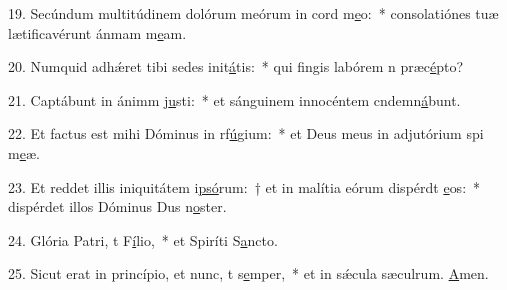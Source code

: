 19. Secúndum multitúdinem dolórum meórum in cord m\uline{e}o:~* consolatiónes tuæ lætificavérunt ánmam m\uline{e}am.\par 
20. Numquid adhǽret tibi sedes init\uline{á}tis:~* qui fingis labórem n præc\uline{é}pto?\par 
21. Captábunt in ánimm j\uline{u}sti:~* et sánguinem innocéntem cndemn\uline{á}bunt.\par 
22. Et factus est mihi Dóminus in rf\uline{ú}gium:~* et Deus meus in adjutórium spi m\uline{e}æ.\par 
23. Et reddet illis iniquitátem i\uline{psó}rum:~† et in malítia eórum dispérdt \uline{e}os:~* dispérdet illos Dóminus Dus n\uline{o}ster.\par 
24. Glória Patri, t F\uline{í}lio,~* et Spiríti S\uline{a}ncto.\par 
25. Sicut erat in princípio, et nunc, t s\uline{e}mper,~* et in sǽcula sæculrum. \uline{A}men.\par 
